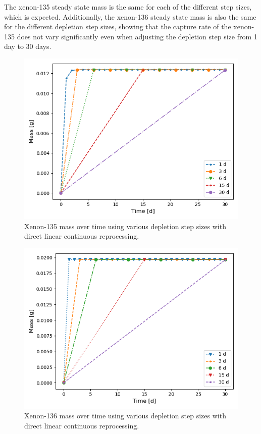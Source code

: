 The xenon-135 steady state mass is the same for each of the different step sizes, which is expected. Additionally, the xenon-136 steady state mass is also the same for the different depletion step sizes, showing that the capture rate of the xenon-135 does not vary significantly even when adjusting the depletion step size from 1 day to 30 days.

\begin{figure}[H]
  \centering
  \includegraphics[scale=0.7]{images/DL_NSTEP_Xe-135_mass.png}
  \caption{Xenon-135 mass over time using various depletion step sizes with direct linear continuous reprocessing.}
   \label{fig:DL-cont-xe135}
\end{figure}

\begin{figure}[H]
  \centering
  \includegraphics[scale=0.7]{images/DL_NSTEP_Xe-136_mass.png}
  \caption{Xenon-136 mass over time using various depletion step sizes with direct linear continuous reprocessing.}
   \label{fig:DL-cont-xe136}
\end{figure}

